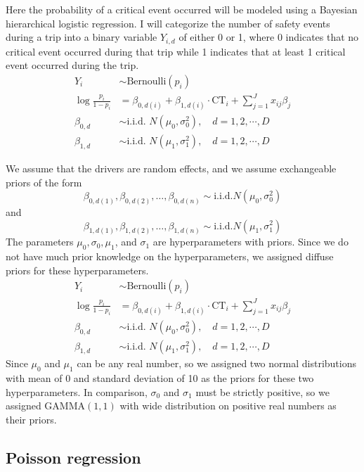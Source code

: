 \documentclass[12pt]{book}
\numberwithin{equation}{chapter}
\begin{document}
Here the probability of a critical event occurred will be modeled using a Bayesian hierarchical logistic regression. I will categorize the number of safety events during a trip into a binary variable \(Y_{i, d}\) of either 0 or 1, where 0 indicates that no critical event occurred during that trip while 1 indicates that at least 1 critical event occurred during the trip.
\[
\begin{split}
Y_{i} &\sim \text{Bernoulli}(p_{i})\\
\log\frac{p_{i}}{1-p_{i}} &= \beta_{0, d(i)} + \beta_{1, d(i)} \cdot \text{CT}_i + \sum_{j=1}^{J} x_{ij}\beta_j\\
\beta_{0, d} &\sim \text{i.i.d. } N(\mu_0, \sigma_0^2), \quad d = 1, 2, \cdots, D\\
\beta_{1, d} &\sim \text{i.i.d. } N(\mu_1, \sigma_1^2), \quad d = 1, 2, \cdots, D
\label{eq:hierarchicallogit}
\end{split}
\]

We assume that the drivers are random effects, and we assume exchangeable priors of the form
\[
\beta_{0, d(1)}, \beta_{0, d(2)}, \ldots , \beta_{0, d(n)} \sim \text{i.i.d.} N(\mu_0,\sigma_0^2)
\]
and
\[
\beta_{1, d(1)}, \beta_{1, d(2)}, \ldots , \beta_{1, d(n)} \sim \text{i.i.d.} N(\mu_1,\sigma_1^2)
\]
The parameters \(\mu_0, \sigma_0, \mu_1\), and \(\sigma_1\) are hyperparameters with priors. Since we do not have much prior knowledge on the hyperparameters, we assigned diffuse priors for these hyperparameters.
\[
\begin{split}
Y_{i} &\sim \text{Bernoulli}(p_{i})\\
\log\frac{p_{i}}{1-p_{i}} &= \beta_{0, d(i)} + \beta_{1, d(i)} \cdot \text{CT}_i + \sum_{j=1}^{J} x_{ij}\beta_j\\
\beta_{0, d} &\sim \text{i.i.d. } N(\mu_0, \sigma_0^2), \quad d = 1, 2, \cdots, D\\
\beta_{1, d} &\sim \text{i.i.d. } N(\mu_1, \sigma_1^2), \quad d = 1, 2, \cdots, D
\label{eq:priors}
\end{split}
\]
Since \(\mu_0\) and \(\mu_1\) can be any real number, so we assigned two normal distributions with mean of 0 and standard deviation of 10 as the priors for these two hyperparameters. In comparison, \(\sigma_0\) and \(\sigma_1\) must be strictly positive, so we assigned GAMMA\((1, 1)\) with wide distribution on positive real numbers as their priors.

\hypertarget{poisson-regression}{%
\subsection{Poisson regression}\label{poisson-regression}}
\end{document}
